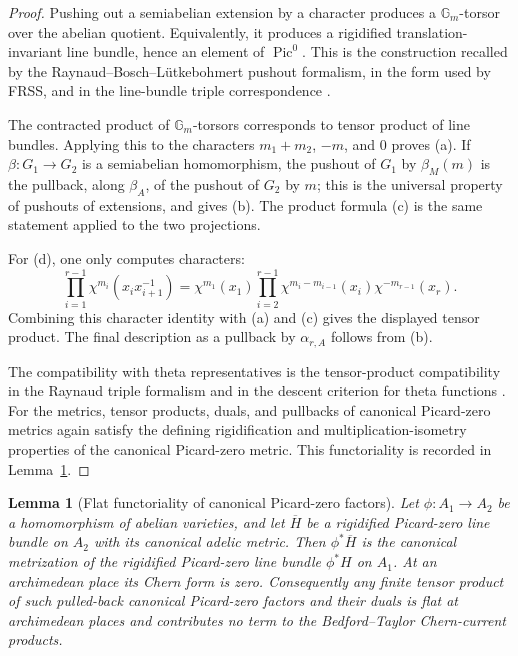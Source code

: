 \documentclass[10pt,a4paper]{amsart}
\theoremstyle{plain}
\newtheorem{lemma}[theorem]{Lemma}
\theoremstyle{plain}
\numberwithin{equation}{section}
\begin{document}
\begin{proof}
	Pushing out a semiabelian extension by a character produces a
	\(\mathbb G_m\)-torsor over the abelian quotient.  Equivalently, it produces a
	rigidified translation-invariant line bundle, hence an element of
	\(\operatorname{Pic}^0\).  This is the construction recalled by the
	Raynaud--Bosch--L\"utkebohmert pushout formalism, in the form used by FRSS, and
	in the line-bundle triple correspondence \cite[Theorem~3.10]{FRSS}.
	
	The contracted product of \(\mathbb G_m\)-torsors corresponds to tensor product
	of line bundles.  Applying this to the characters \(m_1+m_2\), \(-m\), and
	\(0\) proves (a).  If \(\beta:G_1\to G_2\) is a semiabelian homomorphism, the
	pushout of \(G_1\) by \(\beta_M(m)\) is the pullback, along \(\beta_A\), of the
	pushout of \(G_2\) by \(m\); this is the universal property of pushouts of
	extensions, and gives (b).  The product formula (c) is the same statement
	applied to the two projections.
	
	For (d), one only computes characters:
	\[
	\prod_{i=1}^{r-1}\chi^{m_i}(x_i x_{i+1}^{-1})
	=
	\chi^{m_1}(x_1)
	\prod_{i=2}^{r-1}\chi^{m_i-m_{i-1}}(x_i)
	\chi^{-m_{r-1}}(x_r).
	\]
	Combining this character identity with (a) and (c) gives the displayed tensor
	product.  The final description as a pullback by \(\alpha_{r,A}\) follows from
	(b).
	
	The compatibility with theta representatives is the tensor-product
	compatibility in the Raynaud triple formalism and in the descent criterion for
	theta functions \cite[Proposition~3.19 and Definition~3.20]{FRSS}.  For the
	metrics, tensor products, duals, and pullbacks of canonical Picard-zero metrics
	again satisfy the defining rigidification and multiplication-isometry
	properties of the canonical Picard-zero metric.  This functoriality is recorded
	in Lemma~\ref{lem:picard-zero-flat-operation-normalization}.
\end{proof}

\begin{lemma}[Flat functoriality of canonical Picard-zero factors]
	\label{lem:picard-zero-flat-operation-normalization}
	Let \(\phi:A_1\to A_2\) be a homomorphism of abelian varieties, and let
	\(\overline H\) be a rigidified Picard-zero line bundle on \(A_2\) with its
	canonical adelic metric.  Then \(\phi^*\overline H\) is the canonical
	metrization of the rigidified Picard-zero line bundle \(\phi^*H\) on \(A_1\).
	At an archimedean place its Chern form is zero.  Consequently any finite
	tensor product of such pulled-back canonical Picard-zero factors and their
	duals is flat at archimedean places and contributes no term to the
	Bedford--Taylor Chern-current products.
\end{lemma}
\end{document}
